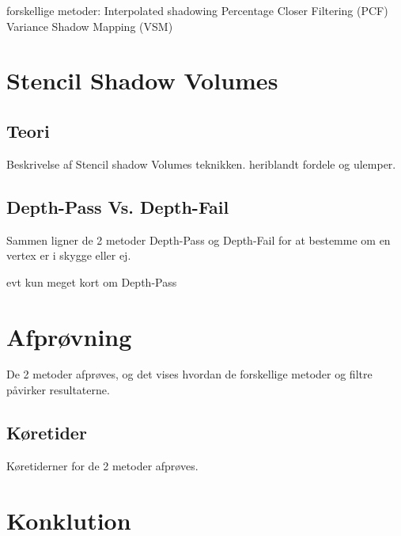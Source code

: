\documentclass[11pt,a4paper]{article}
\begin{document}
forskellige metoder:
Interpolated shadowing
Percentage Closer Filtering (PCF)
Variance Shadow Mapping (VSM)


\section{Stencil Shadow Volumes}

\subsection{Teori}
Beskrivelse af Stencil shadow Volumes teknikken. heriblandt fordele og ulemper.


\subsection{Depth-Pass Vs. Depth-Fail}
Sammen ligner de 2 metoder Depth-Pass og Depth-Fail for at bestemme om en vertex er i skygge eller ej.

evt kun meget kort om Depth-Pass


\section{Afprøvning}
 De 2 metoder afprøves, og det vises hvordan de forskellige metoder og filtre påvirker resultaterne.	

\subsection{Køretider}
Køretiderner for de 2 metoder afprøves.

\section{Konklution}
\end{document}
